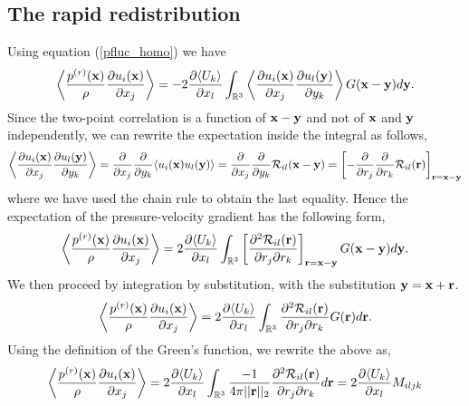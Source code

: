 \documentclass[oneside,a4paper,11pt]{report}
\newcommand{\tpvc}{\mathcal{R}} %
\newcommand{\ukavg}{\langle U_k \rangle}
\begin{document}
\subsection{The rapid redistribution}

Using equation (\ref{pfluc_homo}) we have
\begin{equation}
\left \langle \frac{p^{(r)}(\xvec)}{\rho}\frac{\partial u_i(\xvec)}{\partial x_j} \right \rangle= -2\frac{\partial \ukavg}{\partial x_l} \int_\Rthree \left \langle \frac{\partial u_i(\xvec)}{\partial x_j} \frac{\partial u_l(\yvec)}{\partial y_k} \right \rangle G(\xvec-\yvec) d\yvec.
\end{equation}
Since the two-point correlation is a function of $\mathbf{x} - \mathbf{y}$ and not of $\mathbf{x}$ and $\mathbf{y}$ independently, we can rewrite the expectation inside the integral as follows,
\begin{equation}
\left \langle \frac{\partial u_i(\xvec)}{\partial x_j} \frac{\partial u_l(\yvec)}{\partial y_k} \right \rangle = \frac{\partial}{\partial x_j} \frac{\partial}{\partial y_k} \langle u_i(\xvec)u_l(\yvec) \rangle = \frac{\partial}{\partial x_j} \frac{\partial}{\partial y_k} \tpvc_{il}(\xvec - \yvec) = \left [-\frac{\partial}{\partial r_j} \frac{\partial}{\partial r_k} \tpvc_{il}(\rvec) \right]_{\rvec = \xvec-\yvec}
\end{equation}
where we have used the chain rule to obtain the last equality.
Hence the expectation of the pressure-velocity gradient has the following form,
\begin{equation}
\left \langle \frac{p^{(r)}(\xvec)}{\rho}\frac{\partial u_i(\xvec)}{\partial x_j} \right \rangle= 2\frac{\partial \ukavg}{\partial x_l} \int_\Rthree \left [\frac{\partial^2 \tpvc_{il}(\rvec)}{\partial r_j \partial r_k} \right]_{\rvec = \xvec-\yvec} G(\xvec-\yvec) d\yvec.
\end{equation}
We then proceed by integration by substitution, with the substitution $\mathbf{y} = \mathbf{x} + \mathbf{r}$.
\begin{equation}
\left \langle \frac{p^{(r)}(\xvec)}{\rho}\frac{\partial u_i(\xvec)}{\partial x_j} \right \rangle = 2\frac{\partial \ukavg}{\partial x_l} \int_\Rthree\frac{\partial^2 \tpvc_{il}(\rvec)}{\partial r_j \partial r_k} G(\rvec) d\rvec.
\end{equation}
Using the definition of the Green's function, we rewrite the above as,
\begin{equation}
\left \langle \frac{p^{(r)}(\xvec)}{\rho}\frac{\partial u_i(\xvec)}{\partial x_j} \right \rangle = 2 \frac{\partial \ukavg}{\partial x_l} \int_\Rthree \frac{-1}{4\pi||\rvec||_2} \frac{\partial^2 \tpvc_{il}(\rvec)}{\partial r_j \partial r_k} d\rvec = 2 \frac{\partial \ukavg}{\partial x_l} M_{iljk}
\end{equation}
\end{document}
